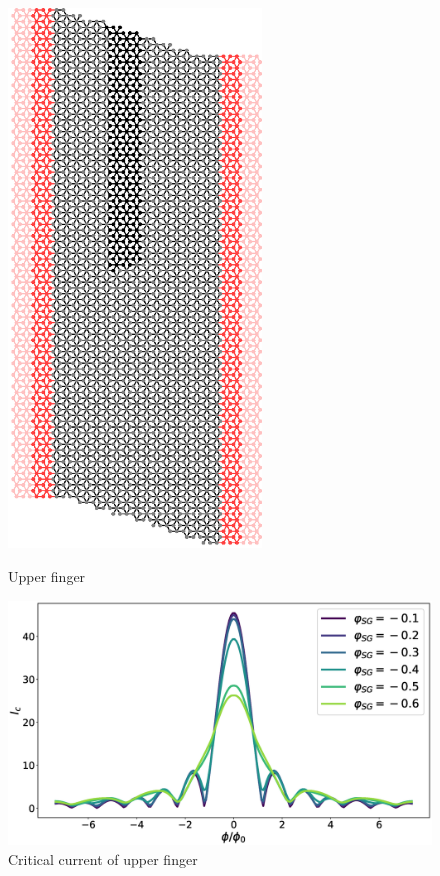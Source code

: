 \documentclass[a4paper]{article}
\begin{document}
\begin{figure}[h!]
\centering
\begin{minipage}{0.3\textwidth}
\centering
\includegraphics[width=0.6\textwidth]{hb_upper}
\caption{Upper finger}
\end{minipage}%
\begin{minipage}{0.7\textwidth}
\centering
\includegraphics[width=\textwidth]{hb_upper_plot}
\caption{Critical current of upper finger}
\end{minipage}
\end{figure}
\end{document}
